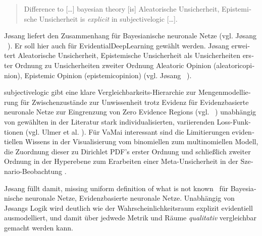 \begin{otherlanguage}{ngerman}
\begin{quote}
  \glqq{}Difference to [\dots] bayesian theory [is] \gls{Aleatorische Unsicherheit}, \gls{Epistemische Unsicherheit} is \textit{explicit} in \gls{subjectivelogic} [\dots].\grqq{}\par\vspace{0\baselineskip}\noindent
  \parencite[{vgl. J\o{}sang S. 42, Z.38 ff.}]{josang2016subjective}
\end{quote}

J\o{}sang liefert den Zusammenhang für \gls{Bayesianische neuronale Netze} (vgl. J\o{}sang ~\parencite[vgl. S.42]{josang2016subjective}). Er soll hier auch für \gls{EvidentialDeepLearning} gewählt werden. J\o{}sang erweitert \gls{Aleatorische Unsicherheit}, \gls{Epistemische Unsicherheit} als Unsicherheiten erster Ordnung zu Unsicherheiten zweiter Ordnung \glqq Aleatoric Opinion \grqq (\gls{aleatoricopinion}), \glqq Epistemic Opinion \grqq (\gls{epistemicopinion}) (vgl. J\o{}sang ~\parencite[{S.22, Z.10-16; S.22 Z. 17-26; S.23, Z. 5-; S.23 Z.9-12}]{josang2016subjective}). \par\vspace{1\baselineskip}\noindent

\gls{subjectivelogic} gibt eine klare Vergleichbarkeits-Hierarchie zur Mengenmodellierung für Zwischenzustände zur Unwissenheit trotz Evidenz für \gls{Evidenzbasierte neuronale Netze} zur Eingrenzung von \glqq Zero Evidence Regions \grqq{} (vgl. ~\parencite[{vgl. S.50}]{josang2016subjective}) unabhängig von gewählten in der Literatur stark individualisierten, variierenden Loss-Funktionen (vgl. Ulmer et al. \parencite{Ulmer2023}). Für VaMai interessant sind die Limitierungen evidentiellen Wissens in der Visualisierung vom binomiellen zum multinomiellen Modell, die Zuordnung dieser zu Dirichlet PDF's erster Ordnung und schließlich zweiter Ordnung in der Hyperebene zum Erarbeiten einer Meta-Unsicherheit \parencite[{S.39, 3.6.1 \glqq hyper-opinion representation\grqq, \glqq hyper-opinion and dirichlet HPDF \grqq}]{josang2016subjective} in der Szenario-Beobachtung \parencite[{S.39, Tabelle 3.3}]{josang2016subjective}. 

J\o{}sang füllt damit, \glqq [the] missing uniform definition of what is not known\grqq ~\parencite[{vgl. S.42}]{josang2016subjective} für \gls{Bayesianische neuronale Netze}, \gls{Evidenzbasierte neuronale Netze}. Unabhängig von J\o{}sangs Logik wird deutlich wie der Wahrscheinlichkeitsraum explizit evidentiell ausmodelliert, und damit über jedwede Metrik und Räume \textit{qualitativ} vergleichbar gemacht werden kann.  


\end{otherlanguage}
